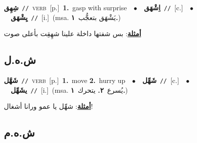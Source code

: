\documentclass[10pt,a4paper,twoside]{article} %
\begin{document}
\begin{multicols}{2}
{\setlength\topsep{0pt}\textbf{\foreignlanguage{arabic}{شِهِق}}\ {\color{gray}\texttt{//}\color{black}}\ \textsc{verb}\ [p.]\ \textbf{1.}~gasp with surprise\ \ $\bullet$\ \ \setlength\topsep{0pt}\textbf{\foreignlanguage{arabic}{اِشْهَق}}\ {\color{gray}\texttt{//}\color{black}}\ [c.]\ \ $\bullet$\ \ \setlength\topsep{0pt}\textbf{\foreignlanguage{arabic}{يِشْهَق}}\ {\color{gray}\texttt{//}\color{black}}\ [i.]\ \color{gray}(msa. \foreignlanguage{arabic}{يَشْهَق بتعجُّب}~\foreignlanguage{arabic}{\textbf{١.}})\color{black}\  \begin{flushright}\color{gray}\foreignlanguage{arabic}{\textbf{\underline{\foreignlanguage{arabic}{أمثلة}}}: بس شفتها داخلة علينا شهِقِت بأعلى صوت}\end{flushright}\color{black}} \vspace{2mm}

\vspace{-3mm}
\subsection*{\color{blue}\foreignlanguage{arabic}{ش.ه.ل}\color{blue}{}} 

{\setlength\topsep{0pt}\textbf{\foreignlanguage{arabic}{شَهَّل}}\ {\color{gray}\texttt{//}\color{black}}\ \textsc{verb}\ [p.]\ \textbf{1.}~move  \textbf{2.}~hurry up\ \ $\bullet$\ \ \setlength\topsep{0pt}\textbf{\foreignlanguage{arabic}{شَهِّل}}\ {\color{gray}\texttt{//}\color{black}}\ [c.]\ \ $\bullet$\ \ \setlength\topsep{0pt}\textbf{\foreignlanguage{arabic}{يشَهِّل}}\ {\color{gray}\texttt{//}\color{black}}\ [i.]\ \color{gray}(msa. \foreignlanguage{arabic}{يُسرع}~\foreignlanguage{arabic}{\textbf{٢.}}  \foreignlanguage{arabic}{يتحرك}~\foreignlanguage{arabic}{\textbf{١.}})\color{black}\  \begin{flushright}\color{gray}\foreignlanguage{arabic}{\textbf{\underline{\foreignlanguage{arabic}{أمثلة}}}: شهِّل يا عمو ورانا أشغال!}\end{flushright}\color{black}} \vspace{2mm}

\vspace{-3mm}
\subsection*{\color{blue}\foreignlanguage{arabic}{ش.ه.م}\color{blue}{}} 


\end{multicols}
\end{document}
